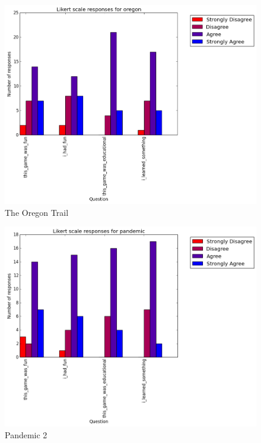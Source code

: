 			\begin{figure}[] 
			\centering 
			\includegraphics[width=\textwidth]{oregon_likert.png} 
			\caption{The Oregon Trail}
			\end{figure}

			\begin{figure}[] 
			\centering 
			\includegraphics[width=\textwidth]{pandemic_likert.png} 
			\caption{Pandemic 2}
			\end{figure}

			\clearpage

